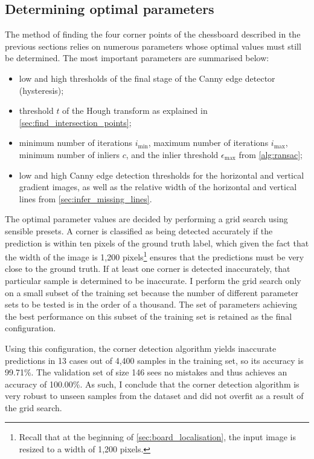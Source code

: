 \documentclass[../report.tex]{subfiles}
\begin{document}
\subsection{Determining optimal parameters}
\label{sec:determine_optimal_params}
The method of finding the four corner points of the chessboard described in the previous sections relies on numerous parameters whose optimal values must still be determined.
The most important parameters are summarised below:
\begin{itemize}
    \item low and high thresholds of the final stage of the Canny edge detector (hysteresis);
    \item threshold $t$ of the Hough transform as explained in \cref{sec:find_intersection_points};
    \item minimum number of iterations $i_\text{min}$, maximum number of iterations $i_\text{max}$, minimum number of inliers $c$, and the inlier threshold $\epsilon_\text{max}$ from \cref{alg:ransac};
    \item low and high Canny edge detection thresholds for the horizontal and vertical gradient images, as well as the relative width of the horizontal and vertical lines from \cref{sec:infer_missing_lines}.
\end{itemize}
The optimal parameter values are decided by performing a grid search using sensible presets.
A corner is classified as being detected accurately if the prediction is within ten pixels of the ground truth label, which given the fact that the width of the image is 1,200 pixels\footnote{Recall that at the beginning of \cref{sec:board_localisation}, the input image is resized to a width of 1,200 pixels.} ensures that the predictions must be very close to the ground truth.
If at least one corner is detected inaccurately, that particular sample is determined to be inaccurate.
I perform the grid search only on a small subset of the training set because the number of different parameter sets to be tested is in the order of a thousand.
The set of parameters achieving the best performance on this subset of the training set is retained as the final configuration.

Using this configuration, the corner detection algorithm yields inaccurate predictions in 13 cases out of 4,400 samples in the training set, so its accuracy is 99.71\%.
The validation set of size 146 sees no mistakes and thus achieves an accuracy of 100.00\%.
As such, I conclude that the corner detection algorithm is very robust to unseen samples from the dataset and did not overfit as a result of the grid search.
\end{document}
